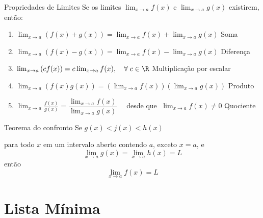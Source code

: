 \begin{frame}{Propriedades de Limites}
  Se os limites \(\lim_{x\to a}f(x)\) e  \(\lim_{x\to a}g(x)\) existirem, então:\\[4mm]
  \pause
  \begin{enumerate}[<+->]
    \item
      \(
        \lim_{x\to a} \left(f(x)+g(x)\right)
        = \lim_{x\to a}f(x) + \lim_{x\to a}g(x)
      \)
      \hfill Soma
      \\[5mm]

    \item
      \(
        \lim_{x\to a} \left(f(x)-g(x)\right)
        = \lim_{x\to a}f(x) - \lim_{x\to a}g(x)
      \)
      \hfill Diferença
      \\[5mm]

    \item
      \(
        \lim_{x\to a} \left(c f(x)\right)
        = c\lim_{x\to a} f(x),\quad \forall\; c\in\R
      \)
      \hfill Multiplicação por escalar
      \\[5mm]

    \item
      \(
        \lim_{x\to a} \left(f(x)g(x)\right)
        = \left(\lim_{x\to a} f(x)\right)\left(\lim_{x\to a} g(x)\right)
      \)
      \hfill Produto
      \\[5mm]

    \item
      \(
        \lim_{x\to a} \frac{f(x)}{g(x)}
        = \dfrac{\displaystyle \lim_{x\to a} f(x)}{\displaystyle \lim_{x\to a} g(x)}\quad
      \)
      desde que $\;\lim_{x\to a} f(x) \neq 0$
      \hfill Quociente
  \end{enumerate}
\end{frame}

\begin{frame}{Teorema do confronto}
  Se \(g(x) < j(x) < h(x)\)

  \pause
  para todo $x$ em um intervalo aberto contendo $a$,
  \pause
  exceto $x = a$,
  \pause
  e
  \[
    \lim_{x\to a} g(x) = \lim_{x\to a} h(x) = L
  \]
  \pause
  então
  \[
   \lim_{x\to a} f(x) = L
  \]
\end{frame}

\section{Lista Mínima}

